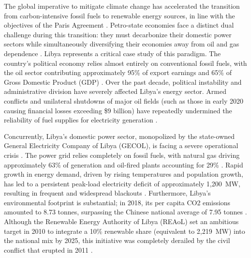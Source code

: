 \documentclass[preprint,12pt]{elsarticle}
\begin{document}
The global imperative to mitigate climate change has accelerated the transition from carbon-intensive fossil fuels to renewable energy sources, in line with the objectives of the Paris Agreement \cite{almaktar2021prospects, alanazi2025renewable}. Petro-state economies face a distinct dual challenge during this transition: they must decarbonize their domestic power sectors while simultaneously diversifying their economies away from oil and gas dependence \cite{almaktar2021prospects, eljrushi1990solar}. Libya represents a critical case study of this paradigm. The country's political economy relies almost entirely on conventional fossil fuels, with the oil sector contributing approximately 95\% of export earnings and 65\% of Gross Domestic Product (GDP) \cite{almaktar2021prospects}. Over the past decade, political instability and administrative division have severely affected Libya's energy sector. Armed conflicts and unilateral shutdowns of major oil fields (such as those in early 2020 causing financial losses exceeding \$9 billion) have repeatedly undermined the reliability of fuel supplies for electricity generation \cite{almaktar2021prospects}.

Concurrently, Libya's domestic power sector, monopolized by the state-owned General Electricity Company of Libya (GECOL), is facing a severe operational crisis \cite{almaktar2021prospects}. The power grid relies completely on fossil fuels, with natural gas driving approximately 63\% of generation and oil-fired plants accounting for 29\% \cite{almaktar2021prospects}. Rapid growth in energy demand, driven by rising temperatures and population growth, has led to a persistent peak-load electricity deficit of approximately 1,200~MW, resulting in frequent and widespread blackouts \cite{almaktar2021prospects}. Furthermore, Libya's environmental footprint is substantial; in 2018, its per capita CO2 emissions amounted to 8.73 tonnes, surpassing the Chinese national average of 7.95 tonnes \cite{almaktar2021prospects}. Although the Renewable Energy Authority of Libya (REAoL) set an ambitious target in 2010 to integrate a 10\% renewable share (equivalent to 2,219~MW) into the national mix by 2025, this initiative was completely derailed by the civil conflict that erupted in 2011 \cite{almaktar2021prospects}.
\end{document}
